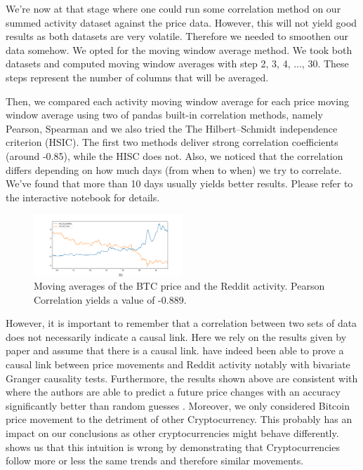We're now at that stage where one could run some correlation method on our summed activity dataset against the price data. However, this will not yield good results as both datasets are very volatile. Therefore we needed to smoothen our data somehow. We opted for the moving window average method. We took both datasets and computed moving window averages with step 2, 3, 4, ..., 30. These steps represent the number of columns that will be averaged. 

Then, we compared each activity moving window average for each price moving window average using two of pandas built-in correlation methods, namely Pearson, Spearman and we also tried the The Hilbert–Schmidt independence criterion (HSIC). The first two methods deliver strong correlation coefficients (around -0.85), while the HISC does not. Also, we noticed that the correlation differs depending on how much days (from when to when) we try to correlate. We've found that more than 10 days usually yields better results. Please refer to the interactive notebook for details.

\begin{figure}[H]
    \centering
    \includegraphics[width=0.5\textwidth]{figures/corr_pearson_0.pdf}
    \caption{Moving averages of the BTC price and the Reddit activity. Pearson Correlation yields a value of -0.889.}
\end{figure}


However, it is important to remember that a correlation between two sets of data does not necessarily indicate a causal link. Here we rely on the results given by paper  and assume that there is a causal link. \citeauthor{wooleyExtractingCryptocurrencyPrice2019} have indeed been able to prove a causal link between price movements and Reddit activity notably with bivariate Granger causality tests. Furthermore, the results shown above are consistent with  where the authors are able to predict a future price changes with an accuracy significantly better than random guesses \cite{iderCryptocurrencyReturnPrediction2022}. Moreover, we only considered Bitcoin price movement to the detriment of other Cryptocurrency. This probably has an impact on our conclusions as other cryptocurrencies might behave differently. \citeauthor{wooleyExtractingCryptocurrencyPrice2019} shows us that this intuition is wrong by demonstrating that Cryptocurrencies follow more or less the same trends and therefore similar movements. 




